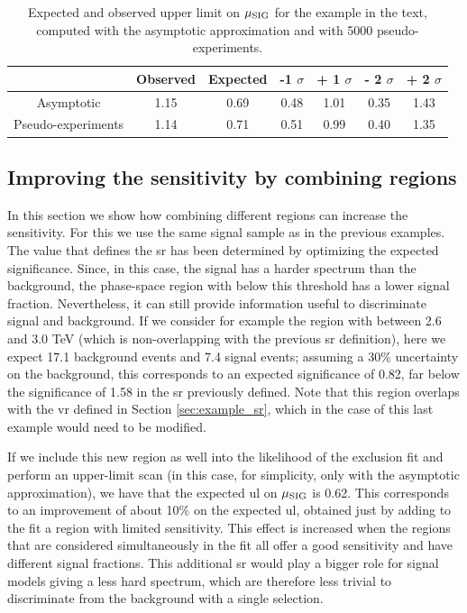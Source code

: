 \begin{table}
\centering
\begin{tabular}{|c|c|c|c|c|c|c|}
\hline 
 & Observed  & Expected &  -1 $\sigma$ & + 1 $\sigma$ & - 2 $\sigma$ &  + 2 $\sigma$ \\ 
\hline 
Asymptotic & 1.15 & 0.69 & 0.48 & 1.01 & 0.35 & 1.43 \\ 
\hline 
Pseudo-experiments & 1.14 & 0.71 & 0.51 & 0.99 & 0.40 & 1.35 \\ 
\hline 
\end{tabular} 
\caption{Expected and observed upper limit on $\mu_{\rm SIG}$ for the example in the text, 
computed with the asymptotic approximation and with 5000 pseudo-experiments.}
\label{tab:stat:exampleUL}
\end{table}



\subsection{Improving the sensitivity by combining regions}
\label{sec:example_combi}

In this section we show how combining different regions can increase the sensitivity. 
For this we use the same signal sample as in the previous examples. 
The \meff value that defines the \gls{sr} has been determined by optimizing the expected significance. 
Since, in this case, the signal has a harder \meff spectrum than the background, the phase-space region 
with \meff below this threshold has a lower signal fraction. Nevertheless, it can still provide information useful to
discriminate signal and background. If we consider for example the region with \meff between 2.6 and 3.0 TeV (which is non-overlapping with 
the previous \gls{sr} definition), here we expect 17.1 background events and 7.4 signal events;
assuming a 30\% uncertainty on the background, this corresponds to an expected significance of 0.82, far below the significance of 1.58 in the 
\gls{sr} previously defined. Note that this region overlaps with the \gls{vr} defined in Section \ref{sec:example_sr}, which in the case of this last example would need to be modified.

If we include this new region as well into the likelihood of the exclusion fit and perform an upper-limit scan (in this case, for simplicity, only with the asymptotic approximation), we have that the expected \gls{ul} on $\mu_{\rm SIG}$ is 0.62. This corresponds to an improvement of about 10\% on the expected \gls{ul}, obtained just by adding to the fit a region with limited sensitivity. This effect is increased when the regions that are considered simultaneously in the fit all offer a good sensitivity and have different signal fractions. 
This additional \gls{sr} would play a bigger role for signal models giving a less hard \meff spectrum, 
which are therefore less trivial to discriminate from the background with a single selection. 



